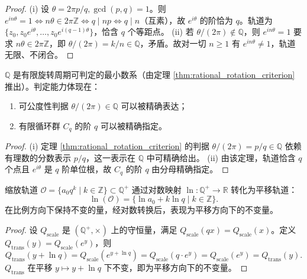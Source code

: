 \begin{proof}
(i) 设 $\theta = 2\pi p/q, \gcd(p,q)=1$。则 $e^{in\theta}=1 \iff n\theta \in 2\pi\mathbb{Z} \iff q \mid np \iff q \mid n$（互素），故 $e^{i\theta}$ 的阶恰为 $q$。轨道为 $\{z_0, z_0 e^{i\theta}, \dots, z_0 e^{i(q-1)\theta}\}$，恰含 $q$ 个等距点。
(ii) 若 $\theta/(2\pi) \notin \mathbb{Q}$，则 $e^{in\theta}=1$ 要求 $n\theta \in 2\pi\mathbb{Z}$，即 $\theta/(2\pi)=k/n \in \mathbb{Q}$，矛盾。故对一切 $n \geq 1$ 有 $e^{in\theta} \neq 1$，轨道无限、不闭合。
\end{proof}

\begin{corollary}[有理数与有限旋转周期]\label{cor:rational_finite_rotation}
$\mathbb{Q}$ 是有限旋转周期可判定的最小数系（由定理 \ref{thm:rational_rotation_criterion} 推出）。判定能力体现在：
\begin{enumerate}[label=(\roman*)]
    \item 可公度性判据 $\theta/(2\pi) \in \mathbb{Q}$ 可以被精确表达；
    \item 有限循环群 $C_q$ 的阶 $q$ 可以被精确指定。
\end{enumerate}
\end{corollary}

\begin{proof}
(i) 定理 \ref{thm:rational_rotation_criterion} 的判据 $\theta/(2\pi) = p/q \in \mathbb{Q}$ 依赖有理数的分数表示 $p/q$，这一表示在 $\mathbb{Q}$ 中可精确给出。
(ii) 由该定理，轨道恰含 $q$ 个点且 $e^{i\theta}$ 是 $q$ 阶单位根，故 $C_q$ 的阶 $q$ 由分母精确指定。
\end{proof}

\begin{proposition}[比例方向与对数同态下的守恒量转换]\label{prop:rational_momentum}
缩放轨道 $\mathcal{O} = \{a_0 q^k \mid k \in \mathbb{Z}\} \subset \mathbb{Q}^+$ 通过对数映射 $\ln: \mathbb{Q}^+ \to \mathbb{R}$ 转化为平移轨道：
\[
\ln(\mathcal{O}) = \{\ln a_0 + k \ln q \mid k \in \mathbb{Z}\}.
\]
在比例方向下保持不变的量，经对数转换后，表现为平移方向下的不变量。
\end{proposition}

\begin{proof}
设 $Q_{\text{scale}}$ 是 $(\mathbb{Q}^+, \times)$ 上的守恒量，满足 $Q_{\text{scale}}(q x) = Q_{\text{scale}}(x)$。定义 $Q_{\text{trans}}(y) = Q_{\text{scale}}(e^y)$，则
\[
Q_{\text{trans}}(y + \ln q) = Q_{\text{scale}}(e^{y + \ln q}) = Q_{\text{scale}}(q \cdot e^y) = Q_{\text{scale}}(e^y) = Q_{\text{trans}}(y).
\]
$Q_{\text{trans}}$ 在平移 $y \mapsto y + \ln q$ 下不变，即为平移方向下的不变量。
\end{proof}

